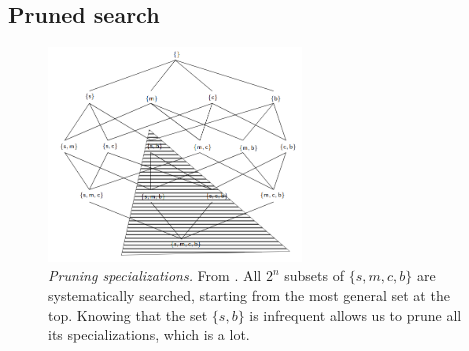\label{sec:pruned-search-meth}
\subsection{Pruned search}

\begin{figure}[htb]
        \centering
        \includegraphics[width=0.6\textwidth]{images/pruning.png}
        \caption{\textit{Pruning specializations.} From \citet[p.~52]{deraedtLogicalRelationalLearning2008}. All $2^n$ subsets of $\{s, m, c, b\}$ are systematically searched, starting from the most general set at the top. Knowing that the set $\{s, b\}$ is infrequent allows us to prune all its specializations, which is a lot. }
        \label{fig:pruning}
\end{figure}

